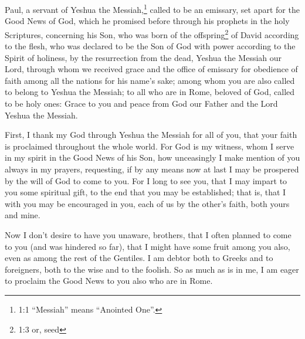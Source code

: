 \newpage
\null
\thispagestyle{empty}
\newpage





\vspace{-1.36in}


\mychapter{} \myverse*{}Paul, a servant of Yeshua the Messiah,\footnote{1:1 “Messiah” means “Anointed One”.} called to be an emissary, set apart for the Good News
of God,
\myverse{}which he promised before through his prophets in the holy Scriptures,
\myverse{}concerning his Son, who was born of the offspring\footnote{1:3 or, seed} of David according to the flesh,
\myverse{}who was declared to be the Son of God with power according to the Spirit of
holiness, by the resurrection from the dead, Yeshua the Messiah our Lord,
\myverse{}through whom we received grace and the office of emissary for obedience of faith
among all the nations for his name’s sake;
\myverse{}among whom you are also called to belong to Yeshua the Messiah;
\myverse{}to all who are in Rome, beloved of God, called to be holy ones: Grace to you
and peace from God our Father and the Lord Yeshua the Messiah.

\myverse{}First, I thank my God through Yeshua the Messiah for all of you,
that your faith is proclaimed throughout the whole world.
\myverse{}For God is my witness, whom I serve in my spirit in the Good News of his Son,
how unceasingly I make mention of you always in my prayers,
\myverse{}requesting, if by any means now at last I may be prospered by the will of
God to come to you.
\myverse{}For I long to see you, that I may impart to you some spiritual gift, to the
end that you may be established;
\myverse{}that is, that I with you may be encouraged in you, each of us by the other’s
faith, both yours and mine.

\myverse{}Now I don’t desire to have you unaware, brothers, that I often
planned to come to you (and was hindered so far), that I might have some fruit among you also, even as
among the rest of the Gentiles.
\myverse{}I am debtor both to Greeks and to foreigners, both to the wise and to the
foolish.
\myverse{}So as much as is in me, I am eager to proclaim the Good News to you also who
are in Rome.

